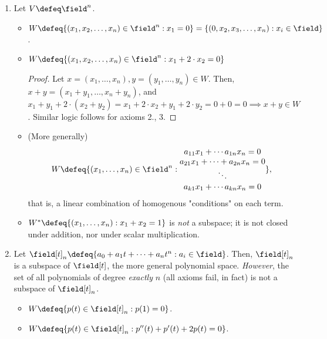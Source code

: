 \begin{example}
    \begin{enumerate}
        \item Let $V \defeq \field^n$.
        \begin{itemize}
            \item $W\defeq \{(x_1, x_2, \dots, x_n) \in \field^n:x_1 = 0\} = \{(0, x_2, x_3, \dots, x_n) :x_i \in \field\}$.
            \item $W\defeq \{(x_1, x_2, \dots, x_n)\in \field^n : x_1 + 2 \cdot x_2 = 0\}$
            \begin{proof}
                Let $x = (x_1, \dots, x_n), y=(y_1, \dots, y_n) \in W$. Then, $x+y = (x_1 + y_1, \dots, x_n + y_n)$, and $x_1 + y_1 + 2 \cdot (x_2 + y_2) = x_1 + 2 \cdot x_2 + y_1 + 2 \cdot y_2 = 0 + 0 = 0 \implies x+ y \in W$. Similar logic follows for axioms 2., 3.
            \end{proof}
            \item (More generally) $$
            W \defeq \{(x_1, \dots, x_n) \in \field^n : \begin{matrix}
                a_{11} x_1 + \cdots a_{1n} x_n = 0\\
                a_{21} x_1 + \cdots + a_{2n} x_n = 0\\
                \ddots\\
                a_{k1} x_1 + \cdots a_{kn} x_n = 0
            \end{matrix}            
                \},
            $$
            that is, a linear combination of homogenous "conditions" on each term.
            \item $W^*\defeq \{(x_1, \dots, x_n) : x_1 + x_2 = 1\}$ is \emph{not} a subspace; it is not closed under addition, nor under scalar multiplication.
        \end{itemize}
        \item Let $\field[t]_n \defeq  \{a_0 + a_1 t + \cdots + a_n t^n : a_i \in \field\}$. Then, $\field[t]_n$ is a subspace of $\field[t]$, the more general polynomial space. \emph{However}, the set of all polynomials of degree \emph{exactly} $n$ (all axioms fail, in fact) is not a subspace of $\field[t]_n$.
        \begin{itemize}
            \item $W\defeq \{p(t) \in \field[t]_n : p(1)=0 \}$.
            \item $W\defeq\{p(t) \in \field[t]_n : p''(t) + p'(t) + 2p(t)= 0\}$.
        \end{itemize}

\end{enumerate}
\end{example}
